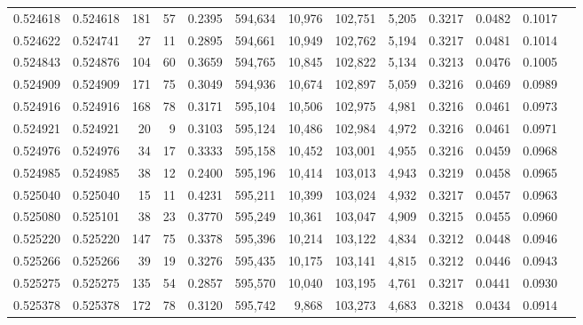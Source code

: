 \begin{tabular}{rrrrrrrrrrrrr}
0.524618 & 0.524618 &   181 &    57 &                                     0.2395 & 594,634 &  10,976 & 102,751 &   5,205 & 0.3217 & 0.0482 & 0.1017 \\
0.524622 & 0.524741 &    27 &    11 &                                     0.2895 & 594,661 &  10,949 & 102,762 &   5,194 & 0.3217 & 0.0481 & 0.1014 \\
0.524843 & 0.524876 &   104 &    60 &                                     0.3659 & 594,765 &  10,845 & 102,822 &   5,134 & 0.3213 & 0.0476 & 0.1005 \\
0.524909 & 0.524909 &   171 &    75 &                                     0.3049 & 594,936 &  10,674 & 102,897 &   5,059 & 0.3216 & 0.0469 & 0.0989 \\
0.524916 & 0.524916 &   168 &    78 &                                     0.3171 & 595,104 &  10,506 & 102,975 &   4,981 & 0.3216 & 0.0461 & 0.0973 \\
0.524921 & 0.524921 &    20 &     9 &                                     0.3103 & 595,124 &  10,486 & 102,984 &   4,972 & 0.3216 & 0.0461 & 0.0971 \\
0.524976 & 0.524976 &    34 &    17 &                                     0.3333 & 595,158 &  10,452 & 103,001 &   4,955 & 0.3216 & 0.0459 & 0.0968 \\
0.524985 & 0.524985 &    38 &    12 &                                     0.2400 & 595,196 &  10,414 & 103,013 &   4,943 & 0.3219 & 0.0458 & 0.0965 \\
0.525040 & 0.525040 &    15 &    11 &                                     0.4231 & 595,211 &  10,399 & 103,024 &   4,932 & 0.3217 & 0.0457 & 0.0963 \\
0.525080 & 0.525101 &    38 &    23 &                                     0.3770 & 595,249 &  10,361 & 103,047 &   4,909 & 0.3215 & 0.0455 & 0.0960 \\
0.525220 & 0.525220 &   147 &    75 &                                     0.3378 & 595,396 &  10,214 & 103,122 &   4,834 & 0.3212 & 0.0448 & 0.0946 \\
0.525266 & 0.525266 &    39 &    19 &                                     0.3276 & 595,435 &  10,175 & 103,141 &   4,815 & 0.3212 & 0.0446 & 0.0943 \\
0.525275 & 0.525275 &   135 &    54 &                                     0.2857 & 595,570 &  10,040 & 103,195 &   4,761 & 0.3217 & 0.0441 & 0.0930 \\
0.525378 & 0.525378 &   172 &    78 &                                     0.3120 & 595,742 &   9,868 & 103,273 &   4,683 & 0.3218 & 0.0434 & 0.0914 \\

\end{tabular}
